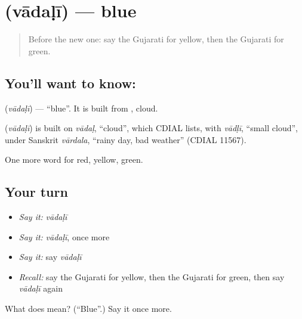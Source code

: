 \section[\texorpdfstring{\gu{વાદળી} (vādaḷī)}{વાદળી (vādaḷī)}]{ (vādaḷī) — blue}

\label{lesson:GU-C70-blue}



\begin{quote}
Before the new one: say the Gujarati for yellow, then the Gujarati for green.
\end{quote}

\subsection*{You'll want to know: }
\textbf{} (\emph{vādaḷī}) — \textquotedblleft{}blue\textquotedblright{}. It is built from \textbf{}, cloud.

\begin{cousinweb}
\textbf{} (\emph{vādaḷī}) is built on \emph{vādaḷ}, \textquotedblleft{}cloud\textquotedblright{}, which CDIAL lists, with \emph{vādḷī}, \textquotedblleft{}small cloud\textquotedblright{}, under Sanskrit \emph{vārdala}, \textquotedblleft{}rainy day, bad weather\textquotedblright{} (CDIAL 11567).
\end{cousinweb}

\begin{grammarlens}[title={What you've built}]
One more word for red, yellow, green.
\end{grammarlens}

\subsection*{Your turn}
\begin{itemize}
\raggedright
  \item \emph{Say it:} \emph{vādaḷī}
  \item \emph{Say it:} \emph{vādaḷī}, once more
  \item \emph{Say it:} say \emph{vādaḷī}
  \item \emph{Recall:} say the Gujarati for yellow, then the Gujarati for green, then say \emph{vādaḷī} again
\end{itemize}

\begin{tcolorbox}[breakable,colback=teal!4,colframe=teal!35!black,title={Before you move on}]
What does  mean? (\textquotedblleft{}Blue\textquotedblright{}.) Say it once more.
\end{tcolorbox}
